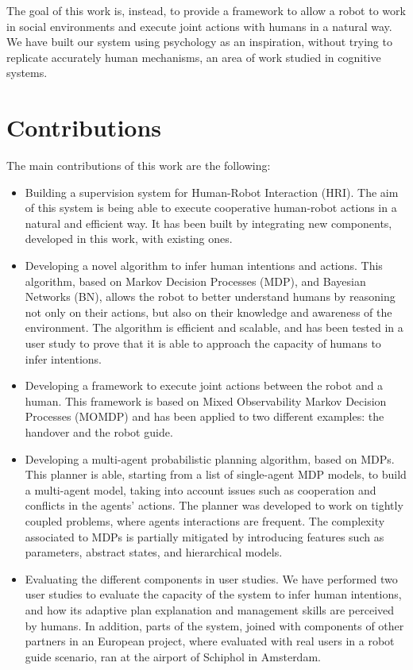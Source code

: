 The goal of this work is, instead, to provide a framework to allow a robot to work in social environments and execute joint actions with humans in a natural way. We have built our system using psychology as an inspiration, without trying to replicate accurately human mechanisms, an area of work studied in cognitive systems. 

\section*{Contributions}

The main contributions of this work are the following:
\begin{itemize}
\item Building a supervision system for Human-Robot Interaction (HRI). The aim of this system is being able to execute cooperative human-robot actions in a natural and efficient way. It has been built by integrating new components, developed in this work, with existing ones.
\item Developing a novel algorithm to infer human intentions and actions. This algorithm, based on Markov Decision Processes (MDP), and Bayesian Networks (BN), allows the robot to better understand humans by reasoning not only on their actions, but also on their knowledge and awareness of the environment. The algorithm is efficient and scalable, and has been tested in a user study to prove that it is able to approach the capacity of humans to infer intentions.
\item Developing a framework to execute joint actions between the robot and a human. This framework is based on Mixed Observability Markov Decision Processes (MOMDP) and has been applied to two different examples: the handover and  the robot guide.
\item Developing a multi-agent probabilistic planning algorithm, based on MDPs. This planner is able, starting from a list of single-agent MDP models, to build a multi-agent model, taking into account issues such as cooperation and conflicts in the agents' actions. The planner was developed to work on tightly coupled problems, where agents interactions are frequent. The complexity associated to MDPs is partially mitigated by introducing features such as parameters, abstract states, and hierarchical models.
\item Evaluating the different components in user studies. We have performed two user studies to evaluate the capacity of the system to infer human intentions, and how its adaptive plan explanation and management skills are perceived by humans. In addition, parts of the system, joined with components of other partners in an European project, where evaluated with real users in a robot guide scenario, ran at the airport of Schiphol in Amsterdam.
\end{itemize}

